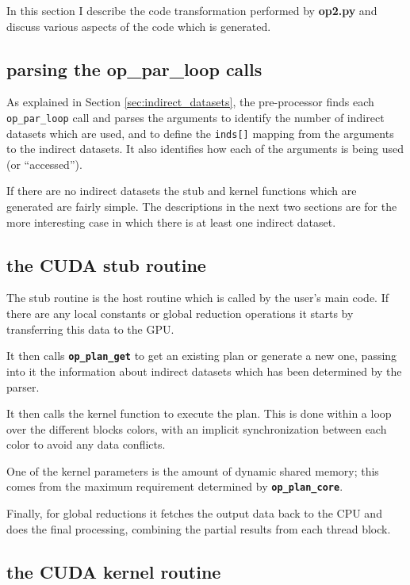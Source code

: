\documentclass[12pt]{article}
\begin{document}
In this section I describe the code transformation performed by
{\bf op2.py} and discuss various aspects of the code which is generated.

\subsection{parsing the op\_par\_loop calls}

As explained in Section \ref{sec:indirect_datasets}, the pre-processor
finds each {\tt op\_par\_loop} call
and parses the arguments to identify the number of indirect
datasets which are used, and to define the {\tt inds[]} mapping
from the arguments to the indirect datasets.  It also identifies
how each of the arguments is being used (or ``accessed'').

If there are no indirect datasets the stub and kernel functions
which are generated are fairly simple.  The descriptions in the next
two sections are for the more interesting case in which there is
at least one indirect dataset.

\subsection{the CUDA stub routine}

The stub routine is the host routine which is called by the user's
main code.  If there are any local constants or global reduction
operations it starts by transferring this data to the GPU.

It then calls {\tt \bf op\_plan\_get} to get an existing plan or
generate a new one, passing into it the information about indirect
datasets which has been determined by the parser.

It then calls the kernel function to execute the plan.  This is
done within a loop over the different blocks colors, with an
implicit synchronization between each color to avoid any data
conflicts.

One of the kernel parameters is the amount of dynamic shared
memory; this comes from the maximum requirement determined
by {\tt \bf op\_plan\_core}.

Finally, for global reductions it fetches the output data back
to the CPU and does the final processing, combining the partial
results from each thread block.


\subsection{the CUDA kernel routine}
\end{document}
